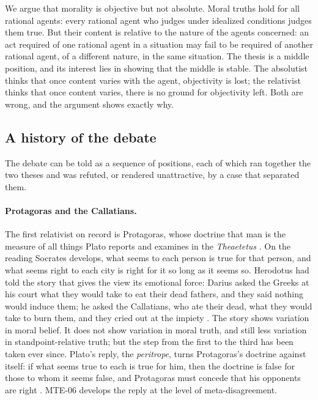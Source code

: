 \documentclass{situationist-preprint}
\begin{document}
We argue that morality is objective but not absolute. Moral truths hold for all rational agents: every rational agent who judges under idealized conditions judges them true. But their content is relative to the nature of the agents concerned: an act required of one rational agent in a situation may fail to be required of another rational agent, of a different nature, in the same situation. The thesis is a middle position, and its interest lies in showing that the middle is stable. The absolutist thinks that once content varies with the agent, objectivity is lost; the relativist thinks that once content varies, there is no ground for objectivity left. Both are wrong, and the argument shows exactly why.

\subsection{A history of the debate}

The debate can be told as a sequence of positions, each of which ran together the two theses and was refuted, or rendered unattractive, by a case that separated them.

\paragraph{Protagoras and the Callatians.} The first relativist on record is Protagoras, whose doctrine that man is the measure of all things Plato reports and examines in the \emph{Theaetetus} \citep[152a]{Theaetetus}. On the reading Socrates develops, what seems to each person is true for that person, and what seems right to each city is right for it so long as it seems so. Herodotus had told the story that gives the view its emotional force: Darius asked the Greeks at his court what they would take to eat their dead fathers, and they said nothing would induce them; he asked the Callatians, who ate their dead, what they would take to burn them, and they cried out at the impiety \citep[III.38]{Herodotus}. The story shows variation in moral belief. It does not show variation in moral truth, and still less variation in standpoint-relative truth; but the step from the first to the third has been taken ever since. Plato's reply, the \emph{peritrope}, turns Protagoras's doctrine against itself: if what seems true to each is true for him, then the doctrine is false for those to whom it seems false, and Protagoras must concede that his opponents are right \citep[170e--171c]{Theaetetus}. MTE-06 develops the reply at the level of meta-disagreement.
\end{document}
